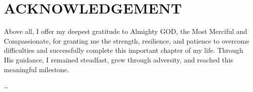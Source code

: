 \section*{\MakeUppercase{Acknowledgement}}
Above all, I offer my deepest gratitude to Almighty GOD, the Most Merciful and Compassionate, for granting me the strength, resilience, and patience to overcome difficulties and successfully complete this important chapter of my life. Through His guidance, I remained steadfast, grew through adversity, and reached this meaningful milestone.

\dots
